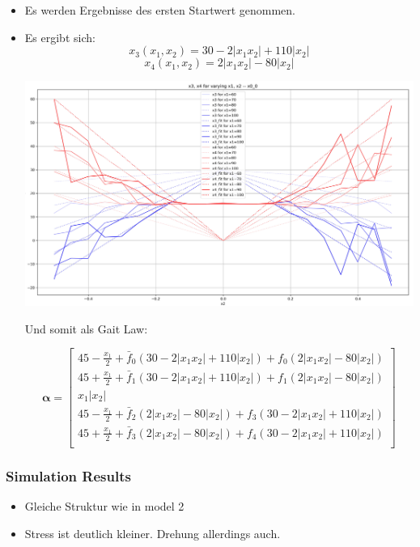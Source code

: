 \documentclass[10pt,a4paper]{article}
\begin{document}
\begin{itemize}
	\item Es werden Ergebnisse des ersten Startwert genommen.

	\item Es ergibt sich:
		\begin{equation}
		x_3 (x_1, x_2) = 30 - 2|x_1x_2| + 110|x_2|
		\end{equation}
		\begin{equation}
		x_4 (x_1, x_2) =  2|x_1x_2| - 80|x_2|
		\end{equation}
		
		\includegraphics[width=.8\textwidth]{pics/model_3/X3X4.jpg}

		Und somit als Gait Law:
	
		\begin{equation}
		\bm{\alpha} = \begin{bmatrix}
		45 - \frac{x_1}{2} + \bar{f}_0(30 - 2|x_1x_2| + 110|x_2|) + f_0(2|x_1x_2| - 80|x_2|) \\
		45 + \frac{x_1}{2} + \bar{f}_1(30 - 2|x_1x_2| + 110|x_2|) + f_1(2|x_1x_2| - 80|x_2|) \\
		x_1|x_2| \\
		45 - \frac{x_1}{2} + \bar{f}_2(2|x_1x_2| - 80|x_2|) + f_3(30 - 2|x_1x_2| + 110|x_2|) \\
		45 + \frac{x_1}{2} + \bar{f}_3(2|x_1x_2| - 80|x_2|) + f_4(30 - 2|x_1x_2| + 110|x_2|) \\
		\end{bmatrix}
		\end{equation}


\end{itemize}

\subsubsection{Simulation Results}

\begin{itemize}
	\item Gleiche Struktur wie in model 2
	\item Stress ist deutlich kleiner. Drehung allerdings auch. 
\end{itemize}
\end{document}
